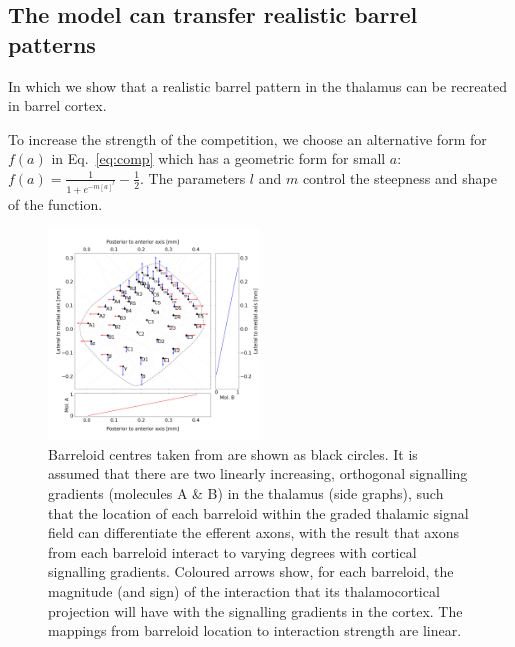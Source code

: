 \documentclass[9pt,twocolumn,twoside,lineno]{pnas-new}
\begin{document}
\subsection*{The model can transfer realistic barrel patterns}

In which we show that a realistic barrel pattern in the thalamus can be
recreated in barrel cortex.


To increase the strength of the competition, we choose an alternative form for
$f(a)$ in Eq.~\ref{eq:comp} which has a geometric form for small $a$: $f(a) = \frac{1}{1 + e^{-m[a]^l}} - \frac{1}{2}$. The parameters $l$ and $m$ control the steepness and shape of the
function.


\begin{figure}
\begin{center}
\includegraphics[width=0.5\textwidth]{../../boundaries/barreloids_haidarliu_graph.png}
\end{center}
\caption{Barreloid centres taken from \cite{haidarliu_size_2001} are shown as
  black circles. It is assumed that there are two linearly increasing,
  orthogonal signalling gradients (molecules A \& B) in the thalamus (side
  graphs), such that the location of each barreloid within the graded thalamic
  signal field can differentiate the efferent axons, with the result that
  axons from each barreloid interact to varying degrees with cortical
  signalling gradients. Coloured arrows show, for each barreloid, the
  magnitude (and sign) of the interaction that its thalamocortical projection
  will have with the signalling gradients in the cortex. The mappings from
  barreloid location to interaction strength are linear.}
\label{fig:barreloids}
\end{figure}
\end{document}
